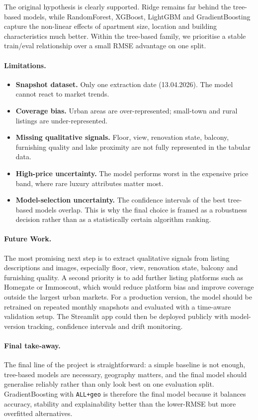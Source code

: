 \documentclass[11pt,a4paper]{article}
\begin{document}
The original hypothesis is clearly supported. Ridge remains far behind the tree-based models, while RandomForest, XGBoost, LightGBM and GradientBoosting capture the non-linear effects of apartment size, location and building characteristics much better. Within the tree-based family, we prioritise a stable train/eval relationship over a small RMSE advantage on one split.

\paragraph{Limitations.}
\begin{itemize}
    \item \textbf{Snapshot dataset.} Only one extraction date (13.04.2026). The model cannot react to market trends.
    \item \textbf{Coverage bias.} Urban areas are over-represented; small-town and rural listings are under-represented.
    \item \textbf{Missing qualitative signals.} Floor, view, renovation state, balcony, furnishing quality and lake proximity are not fully represented in the tabular data.
    \item \textbf{High-price uncertainty.} The model performs worst in the expensive price band, where rare luxury attributes matter most.
    \item \textbf{Model-selection uncertainty.} The confidence intervals of the best tree-based models overlap. This is why the final choice is framed as a robustness decision rather than as a statistically certain algorithm ranking.
\end{itemize}

\paragraph{Future Work.}
The most promising next step is to extract qualitative signals from listing descriptions and images, especially floor, view, renovation state, balcony and furnishing quality. A second priority is to add further listing platforms such as Homegate or Immoscout, which would reduce platform bias and improve coverage outside the largest urban markets. For a production version, the model should be retrained on repeated monthly snapshots and evaluated with a time-aware validation setup. The Streamlit app could then be deployed publicly with model-version tracking, confidence intervals and drift monitoring.

\paragraph{Final take-away.}
The final line of the project is straightforward: a simple baseline is not enough, tree-based models are necessary, geography matters, and the final model should generalise reliably rather than only look best on one evaluation split. GradientBoosting with \texttt{ALL+geo} is therefore the final model because it balances accuracy, stability and explainability better than the lower-RMSE but more overfitted alternatives.
\end{document}
